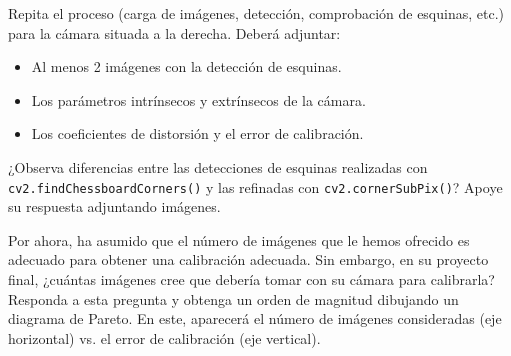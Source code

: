 \vspace{5mm}
\begin{tcolorbox}[colback=gray!10, colframe=gray!30, coltitle=black, title=Pregunta A.1, halign=left]
Repita el proceso (carga de imágenes, detección, comprobación de esquinas, etc.) para la cámara situada a la derecha. Deberá adjuntar:
\begin{itemize}
    \item Al menos 2 imágenes con la detección de esquinas.
    \item Los parámetros intrínsecos y extrínsecos de la cámara.
    \item Los coeficientes de distorsión y el error de calibración.
\end{itemize}
\end{tcolorbox}


\vspace{5mm}
\begin{tcolorbox}[colback=gray!10, colframe=gray!30, coltitle=black, title=Pregunta A.2, halign=left]
¿Observa diferencias entre las detecciones de esquinas realizadas con \texttt{cv2.findChessboardCorners()} y las refinadas con \texttt{cv2.cornerSubPix()}? Apoye su respuesta adjuntando imágenes.
\end{tcolorbox}

\vspace{5mm}
\begin{tcolorbox}[colback=gray!10, colframe=gray!30, coltitle=black, title=Pregunta A.3, halign=left]
Por ahora, ha asumido que el número de imágenes que le hemos ofrecido es adecuado para obtener una calibración adecuada. Sin embargo, en su proyecto final, ¿cuántas imágenes cree que debería tomar con su cámara para calibrarla? Responda a esta pregunta y obtenga un orden de magnitud dibujando un diagrama de Pareto. En este, aparecerá el número de imágenes consideradas (eje horizontal) vs. el error de calibración (eje vertical).
\end{tcolorbox}